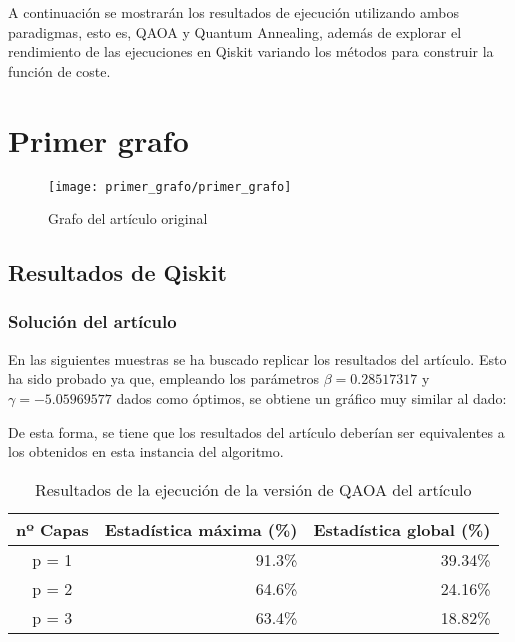 \documentclass{article}
\begin{document}
A continuación se mostrarán los resultados de ejecución utilizando ambos paradigmas, esto es, QAOA y Quantum Annealing, además de explorar el rendimiento de las ejecuciones en Qiskit variando los métodos para construir la función de coste.

\newpage
\section{Primer grafo}
\label{sec:primer-grafo}

\begin{figure}[htbp]
  \centering
  \texttt{[image: primer\_grafo/primer\_grafo]}
  \caption{Grafo del artículo original} \label{fig:primer_grafo/primer_grafo}
\end{figure}

\subsection{Resultados de Qiskit}
\label{sec:primer-resultados-qiskit}

\subsubsection{Solución del artículo}
\label{sec:primer-resultados-qiskit-paper}
En las siguientes muestras se ha buscado replicar los resultados del artículo. Esto ha sido probado ya que, empleando los parámetros \(\beta = 0.28517317\) y \(\gamma = -5.05969577 \) dados como óptimos, se obtiene un gráfico muy similar al dado: \\

\begin{figure}[htbp]
  \centering
  \caption{} \label{fig:primer_grafo/sin_restriccion_extra/primer_paper_aer_resultado}
\end{figure}

De esta forma, se tiene que los resultados del artículo deberían ser equivalentes a los obtenidos en esta instancia del algoritmo.

\begin{table}[htbp]
  \centering
  \begin{tabular}{|c|r|r|}
    \hline
    \textbf{nº Capas} & \textbf{Estadística máxima (\%)} & \textbf{Estadística global (\%)} \\ \hline
    p = 1 & 91.3\% & 39.34\% \\ \hline
    p = 2 & 64.6\% & 24.16\% \\ \hline
    p = 3 & 63.4\% & 18.82\% \\ \hline
  \end{tabular}
  \caption{Resultados de la ejecución de la versión de QAOA del artículo}
  \label{tab:primer_paper_aer_estadisticas}
\end{table}
\end{document}
